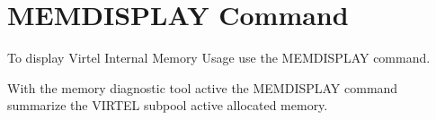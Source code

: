 \documentclass[letterpaper,10pt,english]{sphinxmanual}
\begin{document}
\newpage

\ignorespaces 

\section{MEMDISPLAY Command}
\label{\detokenize{audit_operations_ and_performance:memdisplay-command}}\label{\detokenize{audit_operations_ and_performance:index-11}}
To display Virtel Internal Memory Usage use the MEMDISPLAY command.

\begin{sphinxVerbatim}[commandchars=\\\{\}]
\end{sphinxVerbatim}

With the memory diagnostic tool active the MEMDISPLAY command summarize the VIRTEL subpool active allocated memory.
\end{document}
